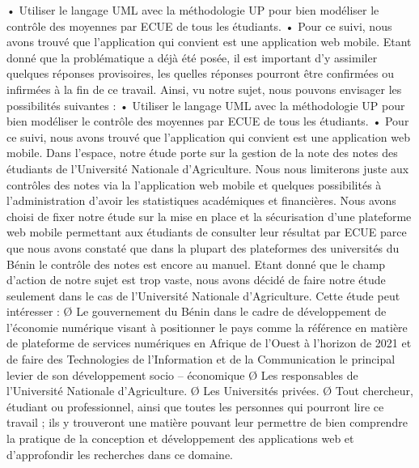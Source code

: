 • Utiliser le langage UML avec la méthodologie UP pour bien modéliser le contrôle des moyennes par ECUE de tous les étudiants.
• Pour ce suivi, nous avons trouvé que l'application qui convient est une application web mobile.
Etant donné que la problématique a déjà été posée, il est important d'y assimiler quelques réponses provisoires, les quelles réponses pourront être confirmées ou infirmées à la fin de ce travail.
Ainsi, vu notre sujet, nous pouvons envisager les possibilités suivantes :
• Utiliser le langage UML avec la méthodologie UP pour bien modéliser le contrôle des moyennes par ECUE de tous les étudiants.
• Pour ce suivi, nous avons trouvé que l'application qui convient est une application web mobile.
Dans l'espace, notre étude porte sur la gestion de la note des notes des étudiants de l’Université Nationale d’Agriculture. Nous nous limiterons juste aux contrôles des notes via la l’application web mobile et quelques possibilités à l'administration d'avoir les statistiques académiques et financières.
Nous avons choisi de fixer notre étude sur la mise en place et la sécurisation d’une plateforme web mobile permettant aux étudiants de consulter leur résultat par ECUE parce que nous avons constaté que dans la plupart des plateformes des universités du Bénin le contrôle des notes est encore au manuel.
Etant donné que le champ d'action de notre sujet est trop vaste, nous avons décidé de faire notre étude seulement dans le cas de l’Université Nationale d’Agriculture. Cette étude peut intéresser :
Ø Le gouvernement du Bénin dans le cadre de développement de l’économie numérique visant à positionner le pays comme la référence en matière de plateforme de services numériques en Afrique de l’Ouest à l’horizon de 2021 et de faire des Technologies de l’Information et de la Communication le principal levier de son développement socio – économique
Ø Les responsables de l’Université Nationale d’Agriculture.
Ø Les Universités privées.
Ø Tout chercheur, étudiant ou professionnel, ainsi que toutes les personnes qui pourront lire ce travail ; ils y trouveront une matière pouvant leur permettre de bien comprendre la pratique de la conception et développement des applications web et d'approfondir les recherches dans ce domaine.


\myCleanStarChapterEnd
